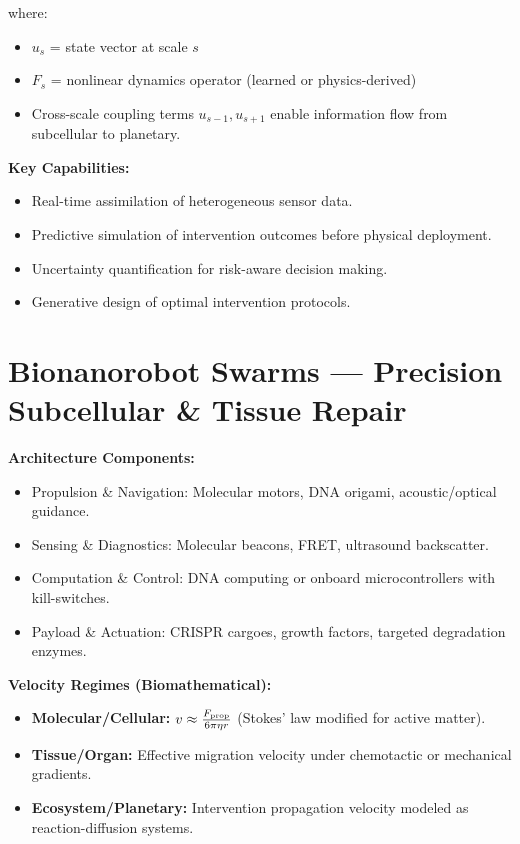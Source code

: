 \documentclass[11pt,a4paper]{report}
\begin{document}
where:
\begin{itemize}
    \item $u_s$ = state vector at scale $s$
    \item $F_s$ = nonlinear dynamics operator (learned or physics-derived)
    \item Cross-scale coupling terms $u_{s-1}, u_{s+1}$ enable information flow from subcellular to planetary.
\end{itemize}

\textbf{Key Capabilities:}
\begin{itemize}
    \item Real-time assimilation of heterogeneous sensor data.
    \item Predictive simulation of intervention outcomes before physical deployment.
    \item Uncertainty quantification for risk-aware decision making.
    \item Generative design of optimal intervention protocols.
\end{itemize}

\section{Bionanorobot Swarms --- Precision Subcellular \& Tissue Repair}

\textbf{Architecture Components:}
\begin{itemize}
    \item Propulsion \& Navigation: Molecular motors, DNA origami, acoustic/optical guidance.
    \item Sensing \& Diagnostics: Molecular beacons, FRET, ultrasound backscatter.
    \item Computation \& Control: DNA computing or onboard microcontrollers with kill-switches.
    \item Payload \& Actuation: CRISPR cargoes, growth factors, targeted degradation enzymes.
\end{itemize}

\textbf{Velocity Regimes (Biomathematical):}

\begin{itemize}
    \item \textbf{Molecular/Cellular:} \( v \approx \frac{F_{\rm prop}}{6\pi\eta r} \) (Stokes' law modified for active matter).
    \item \textbf{Tissue/Organ:} Effective migration velocity under chemotactic or mechanical gradients.
    \item \textbf{Ecosystem/Planetary:} Intervention propagation velocity modeled as reaction-diffusion systems.
\end{itemize}
\end{document}
